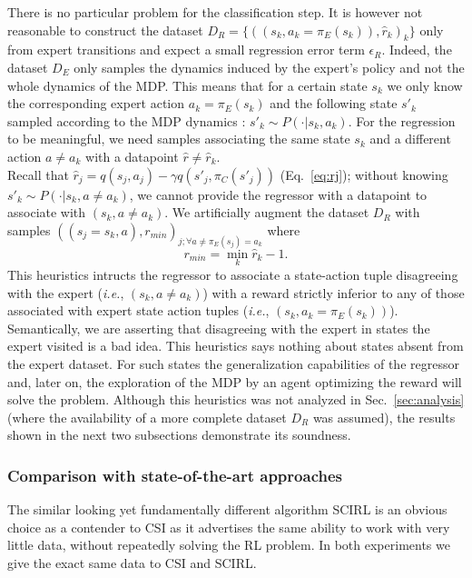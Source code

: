 \documentclass[smallextended]{svjour3}
\begin{document}
There is no particular problem for the classification step. It is however not reasonable to construct the dataset $D_R = \{((s_k,a_k=\pi_E(s_k)),\hat r_k)_k\}$ only from expert transitions and expect a small regression error term $\epsilon_R$. Indeed, the dataset $D_E$ only samples the dynamics induced by the expert's policy and not the whole dynamics of the MDP. 
This means that for a certain state $s_k$ we only know the corresponding expert action $a_k=\pi_E(s_k)$ and the following state $s'_k$ sampled according to the MDP dynamics : $s'_k \sim P(\cdot|s_k,a_k)$. For the regression to be meaningful, we need samples associating the same state $s_k$ and a different action $a\neq a_k$ with a datapoint $\hat r \neq \hat r_k$.\\
Recall that $\hat r_j = q(s_j,a_j) - \gamma q(s'_j,\pi_C(s'_j))$ (Eq.~\eqref{eq:rj}); without knowing $s'_k \sim P(\cdot|s_k,a\neq a_k)$, we cannot provide the regressor with a datapoint to associate with $(s_k,a\neq a_k)$.
We artificially augment the dataset $D_R$ with samples $((s_j=s_k,a),r_{min})_{j;\forall a\neq \pi_E(s_j) = a_k}$ where
\begin{equation}
  r_{min} = \min_k\hat r_k - 1.
\end{equation}
This heuristics intructs the regressor to associate a state-action tuple disagreeing with the expert ({\it i.e.}, $(s_k,a\neq a_k)$) with a reward strictly inferior to any of those associated with expert state action tuples ({\it i.e.}, $(s_k,a_k=\pi_E(s_k))$). Semantically, we are asserting that disagreeing with the expert in states the expert visited is a bad idea. This heuristics says nothing about states absent from the expert dataset. For such states the generalization capabilities of the regressor and, later on, the exploration of the MDP by an agent optimizing the reward will solve the problem.
Although this heuristics was not analyzed in Sec.~\ref{sec:analysis} (where the availability of a more complete dataset $D_R$ was assumed), the results shown in the next two subsections demonstrate its soundness.
\subsubsection{Comparison with state-of-the-art approaches}
The similar looking yet fundamentally different algorithm SCIRL \cite{klein2012scirl} is an obvious choice as a contender to CSI as it advertises the same ability to work with very little data, without repeatedly solving the RL problem. In both experiments we give the exact same data to CSI and SCIRL.
\end{document}
